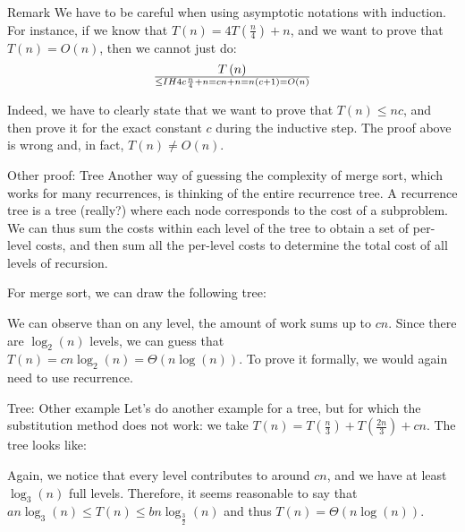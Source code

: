 \documentclass[a4paper]{article}
\begin{document}
\begin{parag}{Remark}
    We have to be careful when using asymptotic notations with induction. For instance, if we know that $T\left(n\right) = 4T\left(\frac{n}{4}\right) + n$, and we want to prove that $T\left(n\right) = O\left(n\right)$, then we cannot just do: 
    \[T\left(n\right) \over{\leq}{IH} 4c \frac{n}{4} + n = cn + n = n\left(c+1\right) = O\left(n\right)\]
    
    Indeed, we have to clearly state that we want to prove that $T\left(n\right) \leq nc$, and then prove it for the exact constant $c$ during the inductive step. The proof above is wrong and, in fact, $T\left(n\right) \neq O\left(n\right)$.
\end{parag}

\begin{parag}{Other proof: Tree}
    Another way of guessing the complexity of merge sort, which works for many recurrences, is thinking of the entire recurrence tree. A recurrence tree is a tree (really?) where each node corresponds to the cost of a subproblem. We can thus sum the costs within each level of the tree to obtain a set of per-level costs, and then sum all the per-level costs to determine the total cost of all levels of recursion.  

    For merge sort, we can draw the following tree:

    We can observe than on any level, the amount of work sums up to $cn$. Since there are $\log_2\left(n\right)$ levels, we can guess that $T\left(n\right) = cn \log_2\left(n\right) = \Theta\left(n \log\left(n\right)\right)$. To prove it formally, we would again need to use recurrence.
\end{parag}

\begin{parag}{Tree: Other example}
    Let's do another example for a tree, but for which the substitution method does not work: we take $T\left(n\right) = T\left(\frac{n}{3}\right) + T\left(\frac{2n}{3}\right) + cn$. The tree looks like:

    Again, we notice that every level contributes to around $cn$, and we have at least $\log_3\left(n\right)$ full levels. Therefore, it seems reasonable to say that $an\log_3\left(n\right) \leq T\left(n\right) \leq bn\log_{\frac{3}{2}}\left(n\right)$ and thus $T\left(n\right) = \Theta\left(n\log\left(n\right)\right)$.
\end{parag}
\end{document}
